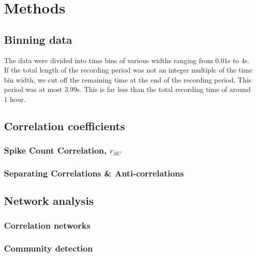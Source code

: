 \documentclass[a4paper,12pt]{article}
\theoremstyle{definition}
\begin{document}
\section{Methods}
    \subsection{Binning data}
    The data were divided into time bins of various widths ranging from $0.01$s to $4$s. If the total length of the recording period was not an integer multiple of the time bin width, we cut off the remaining time at the end of the recording period. This period was at most $3.99$s. This is far less than the total recording time of around $1$ hour.

    \subsection{Correlation coefficients}

    \subsubsection{Spike Count Correlation, $r_{SC}$}\label{sec:spike_count_correlation}

    \subsubsection{Separating Correlations \& Anti-correlations}\label{sec:corr_anti_corr}

    \subsection{Network analysis}

    \subsubsection{Correlation networks}

    \subsubsection{Community detection}



\newpage

\end{document}
